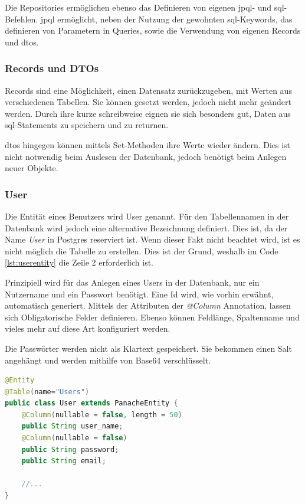 Die Repositories ermöglichen ebenso das Definieren von eigenen \gls{jpql}- und \gls{sql}-Befehlen. 
\gls{jpql} ermöglicht, neben der Nutzung der gewohnten \gls{sql}-Keywords, das definieren von Parametern in Queries, sowie die Verwendung von eigenen Records und \gls{dto}s.

\subsubsection{Records und DTOs}
Records sind eine Möglichkeit, einen Datensatz zurückzugeben, mit Werten aus verschiedenen Tabellen. 
Sie können gesetzt werden, jedoch nicht mehr geändert werden. 
Durch ihre kurze schreibweise eignen sie sich besonders gut, Daten aus \gls{sql}-Statements zu speichern und zu returnen.

\gls{dto}s hingegen können mittels Set-Methoden ihre Werte wieder ändern.
Dies ist nicht notwendig beim Auslesen der Datenbank, jedoch benötigt beim Anlegen neuer Objekte. 

\subsubsection{User}
Die Entität eines Benutzers wird User genannt. 
Für den Tabellennamen in der Datenbank wird jedoch eine alternative Bezeichnung definiert.
Dies ist, da der Name \emph{User} in Postgres reserviert ist. 
Wenn dieser Fakt nicht beachtet wird, ist es nicht möglich die Tabelle zu erstellen.
Dies ist der Grund, weshalb im Code \ref{lst:userentity} die Zeile 2 erforderlich ist.

Prinzipiell wird für das Anlegen eines Users in der Datenbank, nur ein Nutzername und ein Passwort benötigt.
Eine Id wird, wie vorhin erwähnt, automatisch generiert. 
Mittels der Attributen der \emph{@Column} Annotation, lassen sich Obligatorische Felder definieren.
Ebenso können Feldlänge, Spaltenname und vieles mehr auf diese Art konfiguriert werden.

Die Passwörter werden nicht als Klartext gespeichert. 
Sie bekommen einen Salt angehängt und werden mithilfe von Base64 verschlüsselt.


\begin{lstlisting}[label=lst:userentity, language=Java, caption=Teil der Entity-Klasse des Users]
@Entity
@Table(name="Users")        
public class User extends PanacheEntity {
    @Column(nullable = false, length = 50)
    public String user_name;
    @Column(nullable = false)
    public String password;
    public String email;

    //...
}
\end{lstlisting}

